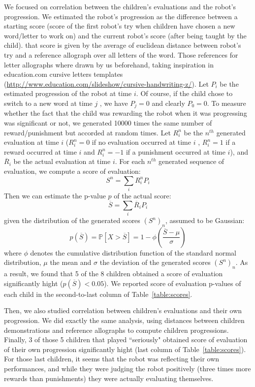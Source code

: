 \documentclass{sig-alternate}
\begin{document}
We focused on correlation between the children's evaluations and the robot's progression.
We estimated the robot's progression as the difference between a starting score
(score of the first robot's try when children have chosen a new word/letter to
work on) and the current robot's score (after being taught by the child). that
score is given by the average of euclidean
distance between robot's try and a reference allograph over all letters of the
word. Those references for letter allographs where drawn by
us beforehand, taking inspiration in education.com cursive letters templates
(\url{http://www.education.com/slideshow/cursive-handwriting-z/}). Let $P_i$ be the
estimated progression of the robot at time $ i$. Of course, if the child
chose to switch to a new word at time $ j$ , we have $ P_{j}=0$ and clearly $
P_0=0$.
To measure whether the fact that the child was rewarding the robot when it was
progressing was significant or not, we generated 10000 times the same number of reward/punishment
but accorded at random times. Let $ R_i^n$ be the $n^{th}$ generated evaluation at
time $ i$ ($ R_i^n = 0$ if
no evaluation occurred at time $ i$ , $ R_i^n=1$ if a reward occurred at time
$i$ and $R_i^n=-1$ if a punishment occurred at time $i$), and $\overline{R}_i$ be the
actual evaluation at time $i$. For each $n^{th}$ generated sequence of evaluation, we
compute a score of evaluation: $$ S^n = \sum\limits_i{R_i^n P_i}$$ 
Then we can estimate the p-value $p$ of the actual score: $$ \overline{S} =
\sum\limits_i{\overline{R}_i P_i}$$ 
given the distribution of the generated scores $\left(S^n\right)_n$, assumed to
be Gaussian: 
$$p(\overline{S})= \mathbb{P}{\left[X>\overline{S}\right]} = 1-\phi{\left(\frac{\overline{S}-\mu}{\sigma}\right)}$$
where $\phi$ denotes the cumulative distribution function of the standard normal
distribution, $\mu$ the mean and $\sigma$ the deviation of the generated 
scores $\left(S^n\right)_n$. 
As a result, we found that 5 of the 8 children obtained a score of evaluation
significantly hight ($p(\overline{S})<0.05$). We reported score of evaluation
p-values of each child in the second-to-last column of Table~\ref{table:scores}.

Then, we also studied correlation between children's evaluations and their own
progression. We did exactly the same analysis, using distances between children
demonstrations and reference allographs to compute children progressions.
Finally, 3 of those 5 children that played ``seriously" obtained score of evaluation of their own
progression significantly hight (last column of Table~\ref{table:scores}). For
those last children, it seems that the robot was reflecting their own performances, and while they
were judging the robot positively (three times more rewards than punishments)
they were actually evaluating themselves.
\end{document}
